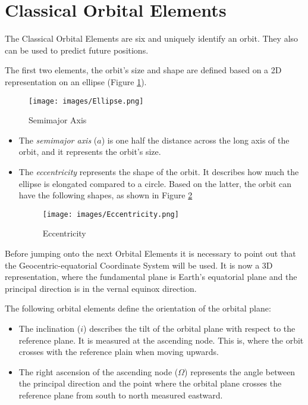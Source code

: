 \section{Classical Orbital Elements}\label{2.2}
The Classical Orbital Elements are six and uniquely identify an orbit. They also can be used to predict future positions.\cite{IntAstr}

The first two elements, the orbit's size and shape are defined based on a 2D representation on an ellipse (Figure \ref{f2.1}).

\begin{figure}[H]
\centerline{\texttt{[image: images/Ellipse.png]}}
\caption{Semimajor Axis}
\label{f2.1}
\end{figure}

\begin{itemize}
\item The \emph{semimajor axis} ($a$) is one half the distance across the long axis of the orbit, and it represents the orbit's size.
\item The \emph{eccentricity} represents the shape of the orbit. It describes how much the ellipse is elongated compared to a circle. Based on the latter, the orbit can have the following shapes, as shown in Figure \ref{f2.2}

\begin{figure}[H]
\centerline{\texttt{[image: images/Eccentricity.png]}}
\caption{Eccentricity}
\label{f2.2}
\end{figure}

\end{itemize}


Before jumping onto the next Orbital Elements it is necessary to point out that the Geocentric-equatorial Coordinate System will be used. It is now a 3D representation, where the fundamental plane is Earth's equatorial plane and the principal direction is in the vernal equinox direction.

The following orbital elements define the orientation of the orbital plane:

\begin{itemize}
\item The inclination ($i$) describes the tilt of the orbital plane with respect to the reference plane. It is measured at the ascending node. This is, where the orbit crosses with the reference plain when moving upwards.
\item The right ascension of the ascending node ($\Omega$) represents the angle between the principal direction and the point where the orbital plane crosses the reference plane from south to north measured eastward. 
\end{itemize}

